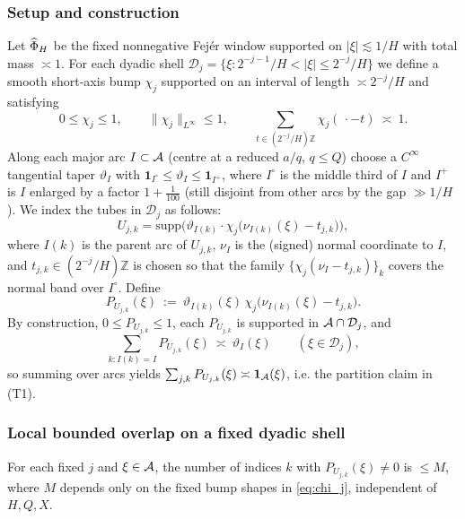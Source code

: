 \subsubsection{Setup and construction}
Let $\widehat\Phi_H$ be the fixed nonnegative Fejér window supported on $|\xi|\lesssim 1/H$ with total mass $\asymp 1$.
For each dyadic shell $\mathcal D_j=\{\xi: 2^{-j-1}/H<|\xi|\le 2^{-j}/H\}$ we define a smooth short-axis bump
$\chi_j$ supported on an interval of length $\asymp 2^{-j}/H$ and satisfying
\begin{equation}\label{eq:chi_j}
0\le \chi_j\le 1,\qquad \|\chi_j\|_{L^\infty}\le 1,\qquad
\sum_{t\in (2^{-j}/H)\mathbb Z}\!\!\chi_j(\,\cdot - t)\ \asymp\ 1.
\end{equation}
Along each major arc $I\subset\mathcal{A}$ (centre at a reduced $a/q$, $q\le Q$) choose a $C^\infty$ tangential taper
$\vartheta_I$ with $\mathbf 1_{I^{\circ}}\le \vartheta_I\le \mathbf 1_{I^{+}}$, where $I^{\circ}$ is the middle third
of $I$ and $I^{+}$ is $I$ enlarged by a factor $1+\frac1{100}$ (still disjoint from other arcs by the gap $\gg 1/H$).
We index the tubes in $\mathcal D_j$ as follows:
\[
U_{j,k}=\text{supp}\Big(\vartheta_{I(k)}\cdot \chi_j\big(\nu_{I(k)}(\xi)-t_{j,k}\big)\Big),
\]
where $I(k)$ is the parent arc of $U_{j,k}$, $\nu_{I}$ is the (signed) normal coordinate to $I$, and
$t_{j,k}\in (2^{-j}/H)\mathbb Z$ is chosen so that the family $\{\chi_j(\nu_{I}-t_{j,k})\}_k$ covers the normal band
over $I^{\circ}$. Define
\begin{equation}\label{eq:P_U_def}
P_{U_{j,k}}(\xi)\ :=\ \vartheta_{I(k)}(\xi)\,\chi_j\big(\nu_{I(k)}(\xi)-t_{j,k}\big).
\end{equation}
By construction, $0\le P_{U_{j,k}}\le 1$, each $P_{U_{j,k}}$ is supported in $\mathcal{A}\cap\mathcal D_j$, and
\[
\sum_{k: I(k)=I} P_{U_{j,k}}(\xi)\ \asymp\ \vartheta_I(\xi)\qquad(\xi\in \mathcal D_j),
\]
so summing over arcs yields $\sum_{j,k}P_{U_{j,k}}(\xi)\asymp \mathbf 1_{\mathcal{A}}(\xi)$, i.e. the partition claim in (T1).

\subsubsection{Local bounded overlap on a fixed dyadic shell}
\begin{lemma}\label{lem:bounded-mult-j}
For each fixed $j$ and $\xi\in\mathcal{A}$, the number of indices $k$ with $P_{U_{j,k}}(\xi)\neq 0$ is $\le M$, where $M$ depends only on the fixed bump shapes in \eqref{eq:chi_j}, independent of $H,Q,X$.
\end{lemma}

